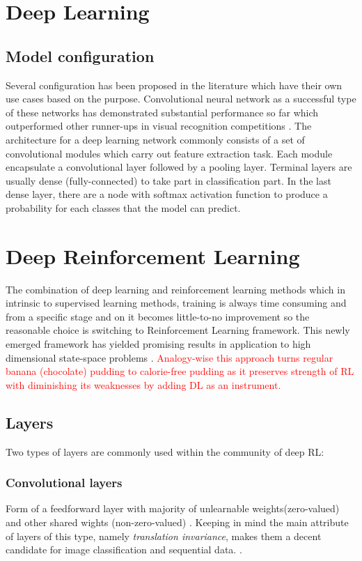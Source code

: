 \documentclass[letterpaper,12pt]{article}
\begin{document}
\section{Deep Learning}
\subsection{Model configuration}
Several configuration has been proposed in the literature which have their own use cases based on the purpose. Convolutional neural network as a successful type of these networks has demonstrated substantial performance so far which outperformed other runner-ups in visual recognition competitions \cite{lecun1998gradient, krizhevsky2012a, zeiler2013, szegedy2014going, he2016a}. The architecture for a deep learning network commonly consists of a set of convolutional modules which carry out feature extraction task. Each module encapsulate a convolutional layer followed by a pooling layer. Terminal layers are usually dense (fully-connected) to take part in classification part. In the last dense layer, there are a node with softmax activation function to produce a probability for each classes that the model can predict.

\section{Deep Reinforcement Learning}
The combination of deep learning and reinforcement learning methods which in intrinsic to supervised learning methods, training is always time consuming and from a specific stage and on it becomes little-to-no improvement so the reasonable choice is switching to Reinforcement Learning framework. This newly emerged framework has yielded promising results in application to high dimensional state-space problems \cite{Francois-Lavet2018}. \textcolor{red}{ Analogy-wise this approach turns regular banana (chocolate) pudding to calorie-free pudding as it preserves strength of RL with diminishing its weaknesses by adding DL as an instrument.}

\subsection{Layers}
Two types of layers are commonly used within the community of deep RL:

\subsubsection{Convolutional layers}
Form of a feedforward layer with majority of unlearnable weights(zero-valued) and other shared wights (non-zero-valued) \cite{Francois-Lavet2018}. Keeping in mind the main attribute of layers of this type, namely \textit{translation invariance}, makes them a decent candidate for image classification and sequential data. \cite{lecun1995a, Francois-Lavet2018}.
\end{document}
